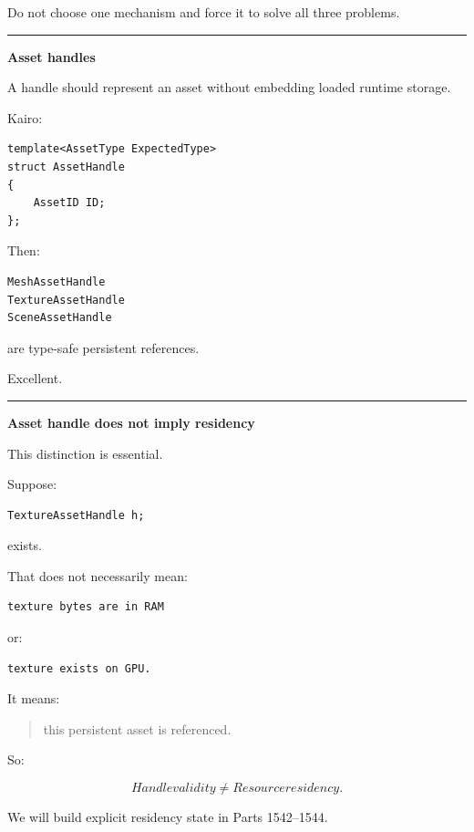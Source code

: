 Do not choose one mechanism and force it to solve all three problems.

\begin{center}\rule{0.5\linewidth}{0.5pt}\end{center}

\textbf{Asset handles}

A handle should represent an asset without embedding loaded runtime storage.

Kairo:

\begin{verbatim}
template<AssetType ExpectedType>
struct AssetHandle
{
    AssetID ID;
};
\end{verbatim}

Then:

\begin{verbatim}
MeshAssetHandle
TextureAssetHandle
SceneAssetHandle
\end{verbatim}

are type-safe persistent references.

Excellent.

\begin{center}\rule{0.5\linewidth}{0.5pt}\end{center}

\textbf{Asset handle does not imply residency}

This distinction is essential.

Suppose:

\begin{verbatim}
TextureAssetHandle h;
\end{verbatim}

exists.

That does not necessarily mean:

\begin{verbatim}
texture bytes are in RAM
\end{verbatim}

or:

\begin{verbatim}
texture exists on GPU.
\end{verbatim}

It means:

\begin{quote}
this persistent asset is referenced.
\end{quote}

So:

\[
\boxed{
Handle validity
\neq
Resource residency.
}
\]

We will build explicit residency state in Parts 1542--1544.

